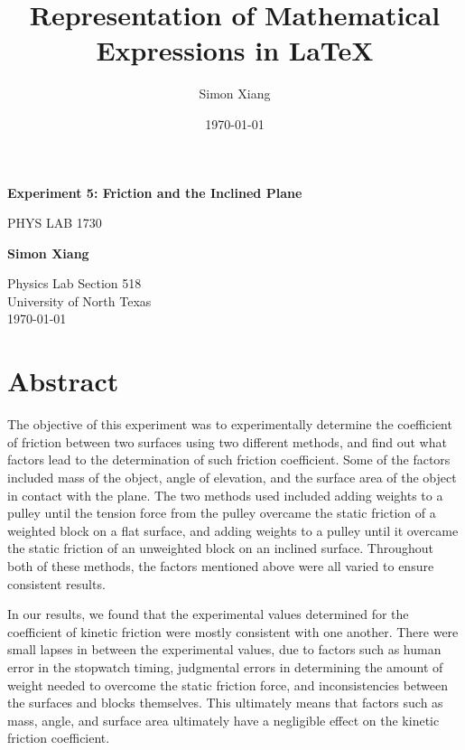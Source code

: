 \documentclass{article}
\title{Representation of Mathematical Expressions in \LaTeX}
\author{Simon Xiang}
\date{\today}
\theoremstyle{definition}
\begin{document}
\begin{titlepage}
    \begin{center}
        \vspace*{1cm}
 
        \Huge
        \textbf{Experiment 5: Friction and the Inclined Plane}
 
        \vspace{0.5cm}
        \LARGE
        PHYS LAB 1730
 
        \vspace{1.5cm}
 
        \textbf{Simon Xiang}
 
        \vfill
  
        \vspace{0.8cm}
 
        \Large
        Physics Lab Section 518\\
        University of North Texas\\
        \today
 
    \end{center}
\end{titlepage}

\section{Abstract}
The objective of this experiment was to experimentally determine the coefficient 
of friction between two surfaces using two different methods, and find out what 
factors lead to the determination of such friction coefficient. Some of the factors
included mass of the object, angle of elevation, and the surface area of the object
in contact with the plane. The two methods used included adding weights to a pulley 
until the tension force from the pulley overcame the static friction of a weighted
block on a flat surface, and adding weights to a pulley until it overcame the static
friction of an unweighted block on an inclined surface. Throughout both of these 
methods, the factors mentioned above were all varied to ensure consistent results.

In our results, we found that the experimental values determined for the 
coefficient of kinetic friction were mostly consistent with one another. There were small
lapses in between the experimental values, due to factors such as human error in 
the stopwatch timing, judgmental errors in determining the amount of weight needed
to overcome the static friction force, and inconsistencies between the surfaces 
and blocks themselves. This ultimately means that factors such as mass, angle, and surface area
ultimately have a negligible effect on the kinetic friction coefficient.
\end{document}
